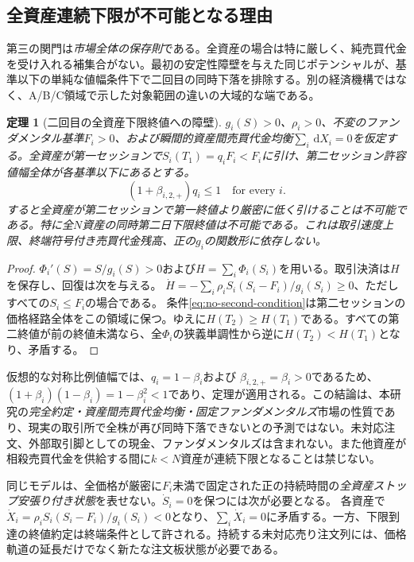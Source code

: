 \documentclass[11pt]{article}
\numberwithin{equation}{section}
\newtheorem{theorem}{定理}[section]
\theoremstyle{definition}
\theoremstyle{remark}
\newcommand{\dd}{\,\mathrm{d}}
\begin{document}
\subsection{全資産連続下限が不可能となる理由}\label{subsec:multiday-full}
第三の関門は\emph{市場全体の保存則}である。全資産の場合は特に厳しく、純売買代金を受け入れる補集合がない。最初の安定性障壁を与えた同じポテンシャルが、基準以下の単純な値幅条件下で二回目の同時下落を排除する。別の経済機構ではなく、A/B/C領域で示した対象範囲の違いの大域的な端である。
\begin{theorem}[二回目の全資産下限終値への障壁]\label{thm:no-second-global}
$g_i(S)>0$、$\rho_i>0$、不変のファンダメンタル基準$F_i>0$、および瞬間的資産間売買代金均衡$\sum_i\dd X_i=0$を仮定する。全資産が第一セッションで$S_i(T_1)=q_iF_i<F_i$に引け、\emph{第二セッション許容値幅全体}が各基準以下にあるとする。
\begin{equation}\label{eq:no-second-condition}
 (1+\beta_{i,2,+})q_i\le1\quad\text{for every }i.
\end{equation}
すると\emph{全資産}が第二セッションで第一終値より厳密に低く引けることは不可能である。特に全$N$資産の同時第二日下限終値は不可能である。これは取引速度上限、終端符号付き売買代金残高、正の$g_i$の関数形に依存しない。
\end{theorem}
\begin{proof}
$\Phi_i'(S)=S/g_i(S)>0$および$H=\sum_i\Phi_i(S_i)$を用いる。取引決済は$H$を保存し、回復は次を与える。
$\dot H=-\sum_i\rho_i S_i(S_i-F_i)/g_i(S_i)\ge0$、ただしすべての$S_i\le F_i$の場合である。
条件\eqref{eq:no-second-condition}は第二セッションの価格経路全体をこの領域に保つ。ゆえに$H(T_2)\ge H(T_1)$である。すべての第二終値が前の終値未満なら、全$\Phi_i$の狭義単調性から逆に$H(T_2)<H(T_1)$となり、矛盾する。
\end{proof}

仮想的な対称比例値幅では、$q_i=1-\beta_i$および
$\beta_{i,2,+}=\beta_i>0$であるため、
$(1+\beta_i)(1-\beta_i)=1-\beta_i^2<1$であり、定理が適用される。この結論は、本研究の\emph{完全約定・資産間売買代金均衡・固定ファンダメンタルズ}市場の性質であり、現実の取引所で全株が再び同時下落できないとの予測ではない。未対応注文、外部取引脚としての現金、ファンダメンタルズは含まれない。また他資産が相殺売買代金を供給する間に$k<N$資産が連続下限となることは禁じない。


同じモデルは、全価格が厳密に$F_i$未満で固定された正の持続時間の\emph{全資産ストップ安張り付き状態}を表せない。$\dot S_i=0$を保つには次が必要となる。
各資産で$\dot X_i=\rho_i S_i(S_i-F_i)/g_i(S_i)<0$となり、$\sum_i\dot X_i=0$に矛盾する。一方、下限到達の終値約定は終端条件として許される。持続する未対応売り注文列には、価格軌道の延長だけでなく新たな注文板状態が必要である。
\end{document}
